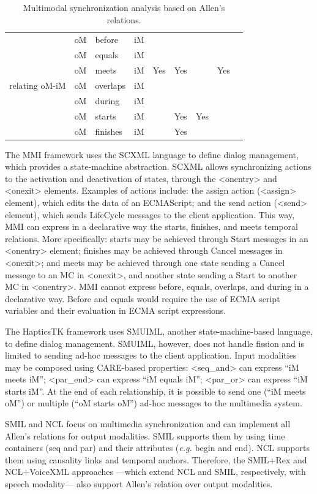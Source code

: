 \begin{table}[!ht]
\begin{tabular}{ m{1.8cm} m{0.5cm} m{1cm} m{0.5cm} m{1cm} m{1cm}
m{1.5cm} m{1.5cm} m{1.5cm}}
	\multirow{7}{*}{relating oM-iM}
	& oM &	before &		iM & & & & & \\
	& oM &	equals &		iM & & & & & \\
	& oM &	meets &			iM & Yes & Yes & & Yes& \\
	& oM &	overlaps &	iM & & & & & \\
	& oM &	during &		iM & & & & & \\
	& oM &	starts &		iM & & Yes & Yes& & \\
	& oM &	finishes &	iM & & Yes & & & \\
	\hline
\end{tabular}
\caption{Multimodal synchronization analysis based on Allen’s relations.}
\label{table:allencomp}
\end{table}

The MMI framework uses the SCXML language to define dialog management, which
provides a state-machine abstraction. SCXML allows synchronizing actions to the
activation and deactivation of states, through the <onentry> and <onexit>
elements. Examples of actions include: the assign action (<assign> element),
which edits the data of an ECMAScript; and the send action (<send> element),
which sends LifeCycle messages to the client application. This way, MMI can
express in a declarative way the starts, finishes, and meets temporal relations.
More specifically: starts may be achieved through Start messages in an <onentry>
element; finishes may be achieved through Cancel messages in <onexit>; and meets
may be achieved through one state sending a Cancel message to an MC in <onexit>,
and another state sending a Start to another MC in <onentry>. MMI cannot express
before, equals, overlaps, and during in a declarative way. Before and equals
would require the use of ECMA script variables and their evaluation in ECMA
script expressions.

The HapticsTK framework uses SMUIML, another state-machine-based language, to
define dialog management. SMUIML, however, does not handle fission and is
limited to sending ad-hoc messages to the client application. Input modalities
may be composed using CARE-based properties: <seq\_and> can express “iM meets
iM”; <par\_end> can express “iM equals iM”; <par\_or> can express “iM starts
iM”. At the end of each relationship, it is possible to send one (“iM meets oM”)
or multiple (“oM starts oM”) ad-hoc messages to the multimedia system.

SMIL and NCL focus on multimedia synchronization and can implement all Allen’s
relations for output modalities. SMIL supports them by using time containers
(seq and par) and their attributes (\textit{e.g.} begin and end). NCL supports them using
causality links and temporal anchors. Therefore, the SMIL+Rex and NCL+VoiceXML
approaches —which extend NCL and SMIL, respectively, with speech modality— also
support Allen’s relation over output modalities.

